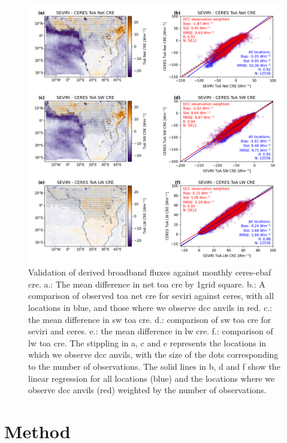 \documentclass[acp, manuscript]{copernicus}
\begin{document}
\begin{figure}[tp]
    \includegraphics[width=12cm]{figures/fig03.png}
    \caption[
    Validation of derived broadband fluxes against monthly \acrshort{ceres}-\acrshort{ebaf} \acrshort{cre}
    ]{
    Validation of derived broadband fluxes against monthly \acrshort{ceres}-\acrshort{ebaf} \acrshort{cre}. a.: The mean difference in net \acrshort{toa} \acrshort{cre} by 1\textdegree grid square. b.: A comparison of observed \acrshort{toa} net \acrshort{cre} for \acrshort{seviri} against \acrshort{ceres}, with all locations in blue, and those where we observe \acrshort{dcc} anvils in red. c.: the mean difference in \acrshort{sw} \acrshort{toa} \acrshort{cre}. d.: comparison of \acrshort{sw} \acrshort{toa} \acrshort{cre} for \acrshort{seviri} and \acrshort{ceres}. e.: the mean difference in \acrshort{lw} \acrshort{cre}. f.: comparison of \acrshort{lw} \acrshort{toa} \acrshort{cre}. The stippling in a, c and e represents the locations in which we observe \acrshort{dcc} anvils, with the size of the dots corresponding to the number of observations. The solid lines in b, d and f show the linear regression for all locations (blue) and the locations where we observe \acrshort{dcc} anvils (red) weighted by the number of observations.
    }
    \label{fig:flux_validation}
\end{figure}

\section{Method}
\end{document}
